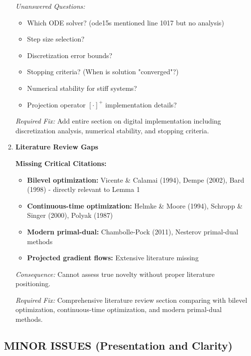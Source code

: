 \documentclass[journal,twoside,web]{ieeecolor}
\begin{document}
\begin{enumerate}[resume]
\textit{Unanswered Questions:}
\begin{itemize}
\item Which ODE solver? (ode15s mentioned line 1017 but no analysis)
\item Step size selection?
\item Discretization error bounds?
\item Stopping criteria? (When is solution "converged"?)
\item Numerical stability for stiff systems?
\item Projection operator $[\cdot]^+$ implementation details?
\end{itemize}

\textit{Required Fix:} Add entire section on digital implementation including discretization analysis, numerical stability, and stopping criteria.

\item \textbf{Literature Review Gaps}

\textbf{Missing Critical Citations:}
\begin{itemize}
\item \textbf{Bilevel optimization:} Vicente \& Calamai (1994), Dempe (2002), Bard (1998) - directly relevant to Lemma 1
\item \textbf{Continuous-time optimization:} Helmke \& Moore (1994), Schropp \& Singer (2000), Polyak (1987)
\item \textbf{Modern primal-dual:} Chambolle-Pock (2011), Nesterov primal-dual methods
\item \textbf{Projected gradient flows:} Extensive literature missing
\end{itemize}

\textit{Consequence:} Cannot assess true novelty without proper literature positioning.

\textit{Required Fix:} Comprehensive literature review section comparing with bilevel optimization, continuous-time optimization, and modern primal-dual methods.

\end{enumerate}

\subsection*{MINOR ISSUES (Presentation and Clarity)}
\end{document}
